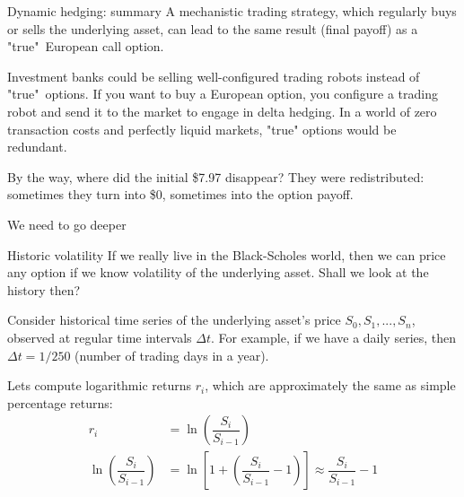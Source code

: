 \documentclass{beamer}
\begin{document}
\begin{frame}{Dynamic hedging: summary}
\justify
A mechanistic trading strategy, which regularly buys or sells the underlying asset, can lead to the same result (final payoff) as a "true"\ European call option.

\justify
Investment banks could be selling well-configured trading robots instead of "true"\ options. If you want to buy a European option, you configure a trading robot and send it to the market to engage in delta hedging. In a world of zero transaction costs and perfectly liquid markets, "true" options would be redundant.

\justify
By the way, where did the initial \$7.97 disappear? They were redistributed: sometimes they turn into \$0, sometimes into the option payoff.
\end{frame}



\begin{frame}{We need to go deeper}
\centering
{}
\end{frame}



\begin{frame}{Historic volatility}
\justify
If we really live in the Black-Scholes world, then we can price any option if we know volatility of the underlying asset. Shall we look at the history then?

\justify
Consider historical time series of the underlying asset's price $S_0,S_1,...,S_n$, observed at regular time intervals $\Delta t$. For example, if we have a daily series, then $\Delta t = 1/250$ (number of trading days in a year). 

\justify
Lets compute logarithmic returns $r_i$, which are approximately the same as simple percentage returns:
\begin{align*}
r_i &= \ln \left( \dfrac{S_{i}}{S_{i-1}} \right) \\
\ln \left(\dfrac{S_{i}}{S_{i-1}} \right) &= \ln \left[1 + \left(\dfrac{S_{i}}{S_{i-1}} - 1 \right) \right] \approx \dfrac{S_{i}}{S_{i-1}} - 1
\end{align*}
\end{frame}
\end{document}
